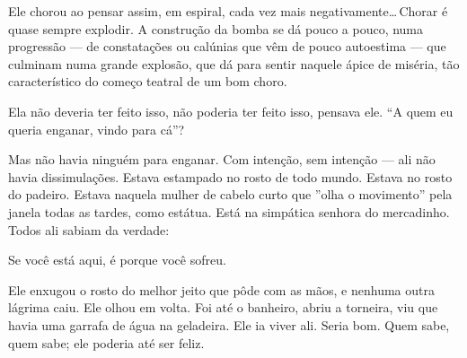Ele chorou ao pensar assim, em espiral, cada vez mais negativamente\ldots\,Chorar é quase sempre explodir. A construção da bomba se dá pouco a pouco, numa progressão --- de constatações ou calúnias que vêm de pouco autoestima --- que culminam numa grande explosão, que dá para sentir naquele ápice de miséria, tão característico do começo teatral de um bom choro.

Ela não deveria ter feito isso, não poderia ter feito isso, pensava ele. ``A quem eu queria enganar, vindo para cá''?

Mas não havia ninguém para enganar. Com intenção, sem intenção --- ali não havia dissimulações. Estava estampado no rosto de todo mundo. Estava no rosto do padeiro. Estava naquela mulher de cabelo curto que ''olha o movimento'' pela janela todas as tardes, como estátua. Está na simpática senhora do mercadinho. Todos ali sabiam da verdade:

Se você está aqui, é porque você sofreu.

Ele enxugou o rosto do melhor jeito que pôde com as mãos, e nenhuma outra lágrima caiu. Ele olhou em volta. Foi até o banheiro, abriu a torneira, viu que havia uma garrafa de água na geladeira. Ele ia viver ali. Seria bom. Quem sabe, quem sabe; ele poderia até ser feliz.
